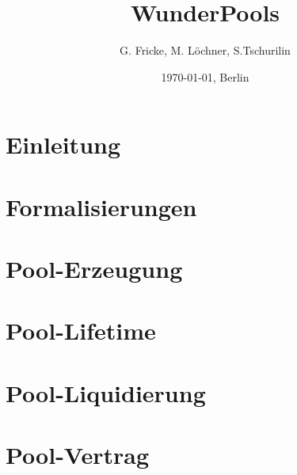 \documentclass[11pt]{scrartcl}
\title{WunderPools}
\author{G. Fricke, M. Löchner, S.Tschurilin}
\date{\today{}, Berlin}
\begin{document}
\maketitle
\tableofcontents{}

\newpage



\section{Einleitung}
\label{sec:pools-einleitung}
\vspace{0.3cm}


\section{Formalisierungen}
\vspace{0.3cm}


\section{Pool-Erzeugung}
\vspace{0.3cm}


\section{Pool-Lifetime}
\vspace{0.3cm}


\section{Pool-Liquidierung}
\label{sec:pools-liquidierung}
\vspace{0.3cm}


\section{Pool-Vertrag}
\label{sec:pools-vertrag}
\vspace{0.3cm}
\end{document}

